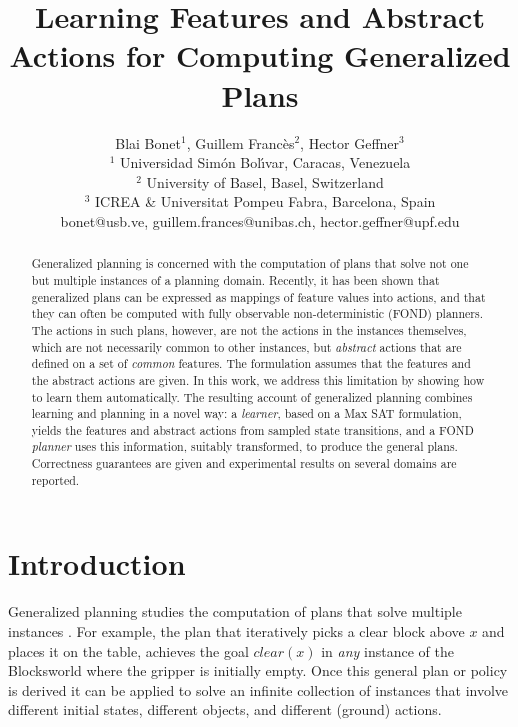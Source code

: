 \documentclass[letterpaper]{article} %
\title{Learning Features and Abstract Actions for Computing Generalized Plans}
\author{
Blai Bonet$^1$,
Guillem Franc\`es$^2$,
Hector Geffner$^3$
\\
$^1$ Universidad Sim\'on Bol\'{\i}var, Caracas, Venezuela\\
$^2$ University of Basel, Basel, Switzerland \\
$^3$ ICREA \& Universitat Pompeu Fabra, Barcelona, Spain\\
%
bonet@usb.ve,
guillem.frances@unibas.ch,
hector.geffner@upf.edu
}
\begin{document}
\maketitle

\begin{abstract}
  Generalized planning is concerned with the computation of plans that solve not one but  multiple instances
  of a planning domain. Recently, it has been shown that generalized plans can be expressed as mappings of feature
  values into actions, and that they can often be computed with fully observable non-deterministic
  (FOND) planners. %
  The actions in such plans, however, are not the actions in the instances themselves, which are
  not necessarily common to  other instances, but \emph{abstract} actions that are defined on a set 
  of \emph{common} features. The formulation assumes that the features and the abstract
  actions are given.
  In this work, we address this limitation by showing how to learn them automatically. 
  The resulting account of generalized planning combines learning and planning
  in a novel way: a \emph{learner}, based on a Max SAT formulation, yields the features and abstract
  actions from sampled state transitions, and a FOND \emph{planner}
  uses this information, suitably transformed, to produce the general plans.
  Correctness guarantees are given and experimental results on several domains are reported.
\end{abstract}


\section{Introduction}

Generalized planning studies the computation of plans  that   solve   multiple  instances
\cite{srivastava08learning,bonet:icaps2009,hu:generalized,BelleL16,anders:generalized}.
For example, the plan  that iteratively  picks  a  clear block above $x$ 
and places it  on the table, achieves the goal $clear(x)$
in \emph{any} instance of the Blocksworld where the gripper is initially empty.
Once this  general plan or  policy is derived it can be  applied to solve an infinite collection
of instances that involve different initial states, different objects, and  different (ground)  actions. 
\end{document}
